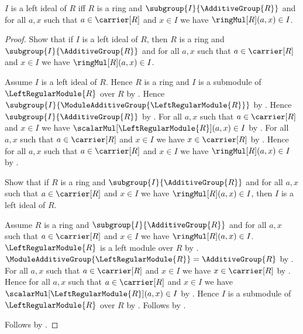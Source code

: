 \begin{theorem}\label{left_ideal_expanded_iff}
    $I$ is a left ideal of $R$ iff
        $R$ is a ring and
        $\subgroup{I}{\AdditiveGroup{R}}$ and
        for all $a,x$ such that $a\in\carrier[R]$ and $x\in I$ we have
            $\ringMul[R](a,x)\in I$.
\end{theorem}
\begin{proof}
    Show that if $I$ is a left ideal of $R$, then
        $R$ is a ring and
        $\subgroup{I}{\AdditiveGroup{R}}$ and
        for all $a,x$ such that $a\in\carrier[R]$ and $x\in I$ we have
            $\ringMul[R](a,x)\in I$.
    \begin{subproof}
        Assume $I$ is a left ideal of $R$.
        Hence $R$ is a ring and
            $I$ is a submodule of $\LeftRegularModule{R}$ over $R$ by
            .
        Hence $\subgroup{I}{
            \ModuleAdditiveGroup{\LeftRegularModule{R}}}$ by
            .
        Hence $\subgroup{I}{\AdditiveGroup{R}}$ by
            .
        For all $a,x$ such that $a\in\carrier[R]$ and $x\in I$ we have
            $\scalarMul[\LeftRegularModule{R}](a,x)\in I$ by
            .
        For all $a,x$ such that $a\in\carrier[R]$ and $x\in I$ we have
            $x\in\carrier[R]$ by
            .
        Hence for all $a,x$ such that $a\in\carrier[R]$ and $x\in I$ we have
            $\ringMul[R](a,x)\in I$ by
            .
    \end{subproof}
    Show that if $R$ is a ring and
        $\subgroup{I}{\AdditiveGroup{R}}$ and
        for all $a,x$ such that $a\in\carrier[R]$ and $x\in I$ we have
            $\ringMul[R](a,x)\in I$, then
        $I$ is a left ideal of $R$.
    \begin{subproof}
        Assume $R$ is a ring and
            $\subgroup{I}{\AdditiveGroup{R}}$ and
            for all $a,x$ such that $a\in\carrier[R]$ and $x\in I$ we have
                $\ringMul[R](a,x)\in I$.
        $\LeftRegularModule{R}$ is a left module over $R$ by
            .
        $\ModuleAdditiveGroup{\LeftRegularModule{R}}
            =\AdditiveGroup{R}$ by
            .
        For all $a,x$ such that $a\in\carrier[R]$ and $x\in I$ we have
            $x\in\carrier[R]$ by
            .
        Hence for all $a,x$ such that $a\in\carrier[R]$ and $x\in I$ we have
            $\scalarMul[\LeftRegularModule{R}](a,x)\in I$ by
            .
        Hence $I$ is a submodule of $\LeftRegularModule{R}$ over $R$ by
            .
        Follows by .
    \end{subproof}
    Follows by \auto.
\end{proof}

